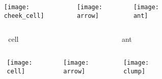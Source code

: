 \begin{figure}
\begin{columns}
\begin{column}{0.05\textwidth}
\begin{subfigure}[b]{\textwidth}
\caption{}
\label{fig:natural}
\end{subfigure}
\end{column}
\begin{column}{0.27\textwidth}
\texttt{[image: cheek\_cell]}
\end{column}
\begin{column}{0.07\textwidth}
\texttt{[image: arrow]}
\end{column}
\begin{column}{0.27\textwidth}
\texttt{[image: ant]}
\end{column}
\end{columns}
\vspace{1ex}
\begin{columns}
\begin{column}{0.05\textwidth}
\end{column}
\begin{column}{0.27\textwidth}
\centering
cell
\end{column}
\begin{column}{0.07\textwidth}
\end{column}
\begin{column}{0.27\textwidth}
\centering
ant
\end{column}
\end{columns}
\vspace{-2ex}
\begin{columns}
\begin{column}{0.05\textwidth}
\begin{subfigure}[b]{\textwidth}
\caption{}
\label{fig:simulated}
\end{subfigure}
\end{column}
\begin{column}{0.27\textwidth}
\texttt{[image: cell]}
\end{column}
\begin{column}{0.07\textwidth}
{\Large\texttt{[image: arrow]}}
\end{column}
\begin{column}{0.27\textwidth}
\texttt{[image: clump]}
\end{column}
\end{columns}
\vspace{1ex}

\end{figure}
